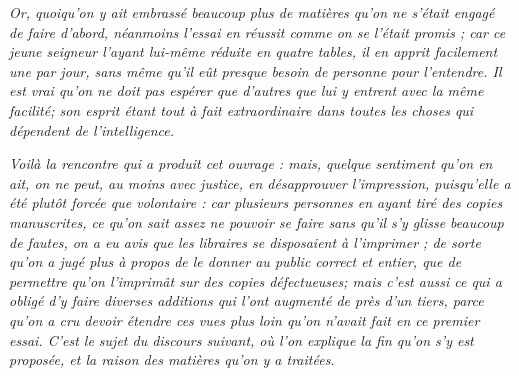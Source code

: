 \emph{Or, quoiqu'on y ait embrassé beaucoup plus de matières qu'on ne s'était engagé de faire d'abord, néanmoins l'essai en réussit comme on se l'était promis ; car ce jeune seigneur l'ayant lui-même réduite en quatre tables, il en apprit facilement une par jour, sans même qu'il eût presque besoin de personne pour l'entendre. Il est vrai qu'on ne doit pas espérer que d'autres que lui y entrent avec la même facilité; son esprit étant tout à fait extraordinaire dans toutes les choses qui dépendent de l'intelligence.}

\emph{Voilà la rencontre qui a produit cet ouvrage : mais, quelque sentiment qu'on en ait, on ne peut, au moins avec justice, en désapprouver l'impression, puisqu'elle a été plutôt forcée que volontaire : car plusieurs personnes en ayant tiré des copies manuscrites, ce qu'on sait assez ne pouvoir se faire sans qu'il s'y glisse beaucoup de fautes, on a eu avis que les libraires se disposaient à l'imprimer ; de sorte qu'on a jugé plus à propos de le donner au public correct et entier, que de permettre qu'on l'imprimât sur des copies défectueuses; mais c'est aussi ce qui a obligé d'y faire diverses additions qui l'ont augmenté de près d'un tiers, parce qu'on a cru devoir étendre ces vues plus loin qu'on n'avait fait en ce premier essai. C'est le sujet du discours suivant, où l'on explique la fin qu'on s'y est proposée, et la raison des matières qu'on y a traitées.}
